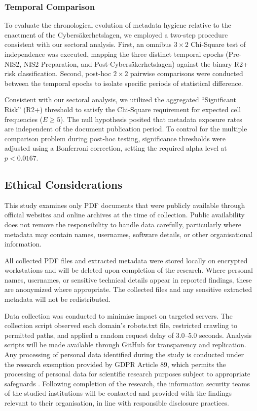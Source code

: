 \documentclass[conference]{IEEEtran}
\begin{document}
\subsubsection{Temporal Comparison}
To evaluate the chronological evolution of metadata hygiene relative to the enactment of the Cybers\"{a}kerhetslagen, we employed a two-step procedure consistent with our sectoral analysis. First, an omnibus $3 \times 2$ Chi-Square test of independence was executed, mapping the three distinct temporal epochs (Pre-NIS2, NIS2 Preparation, and Post-Cybers\"{a}kerhetslagen) against the binary R2+ risk classification. Second, post-hoc $2 \times 2$ pairwise comparisons were conducted between the temporal epochs to isolate specific periods of statistical difference.

Consistent with our sectoral analysis, we utilized the aggregated ``Significant Risk'' (R2+) threshold to satisfy the Chi-Square requirement for expected cell frequencies ($E \geq 5$). The null hypothesis posited that metadata exposure rates are independent of the document publication period. To control for the multiple comparison problem during post-hoc testing, significance thresholds were adjusted using a Bonferroni correction, setting the required alpha level at $p < 0.0167$.

\subsection{Ethical Considerations}
This study examines only PDF documents that were publicly available through official websites and online archives at the time of collection. Public availability does not remove the responsibility to handle data carefully, particularly where metadata may contain names, usernames, software details, or other organisational information.

All collected PDF files and extracted metadata were stored locally on encrypted workstations and will be deleted upon completion of the research. Where personal names, usernames, or sensitive technical details appear in reported findings, these are anonymized where appropriate. The collected files and any sensitive extracted metadata will not be redistributed.

Data collection was conducted to minimise impact on targeted servers. The collection script observed each domain's robots.txt file, restricted crawling to permitted paths, and applied a random request delay of 3.0–5.0 seconds. Analysis scripts will be made available through GitHub for transparency and replication. Any processing of personal data identified during the study is conducted under the research exemption provided by GDPR Article 89, which permits the processing of personal data for scientific research purposes subject to appropriate safeguards \cite{eu-gdpr}. Following completion of the research, the information security teams of the studied institutions will be contacted and provided with the findings relevant to their organisation, in line with responsible disclosure practices. 
\end{document}
